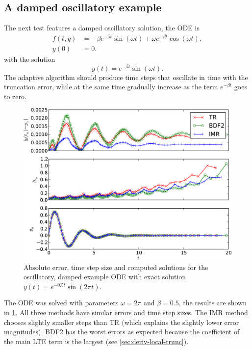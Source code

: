 \subsection{A damped oscillatory example}
\label{sec:oscill-damp-example}

The next test features a damped oscillatory solution, the ODE is
\begin{equation}
  \label{eqn:imr-test-osc-damp}
  \begin{aligned}
    f(t,y) &= - \beta e^{-\beta t} \sin(\omega t) + \omega e^{-\beta t} \cos(\omega t), \\
    y(0) &= 0.
  \end{aligned}
\end{equation}
with the solution
\begin{equation}
  y(t) = e^{-\beta t} \sin(\omega t).
\end{equation}
The adaptive algorithm should produce time steps that oscillate in time with the truncation error, while at the same time gradually increase as the term $e^{-\beta t}$ goes to zero.

\begin{figure}
  \centering \includegraphics[width=1\textwidth]{plots/aimr_odes_traces/damped_oscillation-errornormsvs-dtsvs-tracevaluesvstimes}
  \caption{Absolute error, time step size and computed solutions for the oscillatory, damped example ODE with exact solution $y(t) = e^{-0.5t} \sin(2\pi t)$.}
  \label{fig:imr-osc-example}
\end{figure}

The ODE was solved with parameters $\omega = 2 \pi$ and $\beta = 0.5$, the results are shown in \cref{fig:imr-osc-example}.
All three methods have similar errors and time step sizes.
The IMR method chooses slightly smaller steps than TR (which explains the slightly lower error magnitudes).
BDF2 has the worst errors as expected because the coefficient of the main LTE term is the largest (see \cref{sec:deriv-local-trunc}).

